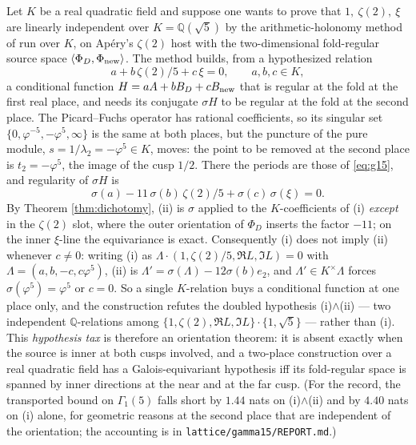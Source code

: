 \documentclass[11pt]{amsart}
\theoremstyle{definition}
\theoremstyle{remark}
\newcommand{\Q}{\mathbb Q}\newcommand{\Z}{\mathbb Z}\newcommand{\R}{\mathbb R}\newcommand{\C}{\mathbb C}\newcommand{\HH}{\mathbb H}
\newcommand{\Phinew}{\Phi_{\rm new}}\newcommand{\Phican}{\Phi_{\rm can}}
\begin{document}
Let $K$ be a real quadratic field and suppose one wants to prove that $1,\ \zeta(2),\ \xi$ are linearly independent over $K=\Q(\sqrt5)$ by the arithmetic-holonomy method of \cite{CDT} run over $K$, on Ap\'ery's $\zeta(2)$ host with the two-dimensional fold-regular source space $\langle\Phi_D,\Phinew\rangle$. The method builds, from a hypothesized relation
\begin{equation}\tag{i}
a+b\,\zeta(2)/5+c\,\xi=0,\qquad a,b,c\in K,
\end{equation}
a conditional function $H=aA+bB_D+cB_{\rm new}$ that is regular at the fold at the first real place, and needs its conjugate $\sigma H$ to be regular at the fold at the second place. The Picard--Fuchs operator has rational coefficients, so its singular set $\{0,\varphi^{-5},-\varphi^5,\infty\}$ is the same at both places, but the puncture of the pure module, $s=1/\lambda_2=-\varphi^5\in K$, moves: the point to be removed at the second place is $t_2=-\varphi^5$, the image of the cusp $1/2$. There the periods are those of \eqref{eq:g15}, and regularity of $\sigma H$ is
\begin{equation}\tag{ii}
\sigma(a)-11\,\sigma(b)\,\zeta(2)/5+\sigma(c)\,\sigma(\xi)=0 .
\end{equation}
By Theorem \ref{thm:dichotomy}, (ii) is $\sigma$ applied to the $K$-coefficients of (i) \emph{except} in the $\zeta(2)$ slot, where the outer orientation of $\Phi_D$ inserts the factor $-11$; on the inner $\xi$-line the equivariance is exact. Consequently (i) does not imply (ii) whenever $c\ne0$: writing (i) as $\Lambda\cdot(1,\zeta(2)/5,\Re L,\Im L)=0$ with $\Lambda=(a,b,-c,c\varphi^5)$, (ii) is $\Lambda'=\sigma(\Lambda)-12\sigma(b)e_2$, and $\Lambda'\in K^\times\Lambda$ forces $\sigma(\varphi^5)=\varphi^5$ or $c=0$. So a single $K$-relation buys a conditional function at one place only, and the construction refutes the doubled hypothesis (i)$\wedge$(ii) --- two independent $\Q$-relations among $\{1,\zeta(2),\Re L,\Im L\}\cdot\{1,\sqrt5\}$ --- rather than (i). This \emph{hypothesis tax} is therefore an orientation theorem: it is absent exactly when the source is inner at both cusps involved, and a two-place construction over a real quadratic field has a Galois-equivariant hypothesis iff its fold-regular space is spanned by inner directions at the near and at the far cusp. (For the record, the transported bound on $\Gamma_1(5)$ falls short by $1.44$ nats on (i)$\wedge$(ii) and by $4.40$ nats on (i) alone, for geometric reasons at the second place that are independent of the orientation; the accounting is in \texttt{lattice/gamma15/REPORT.md}.)
\end{document}
